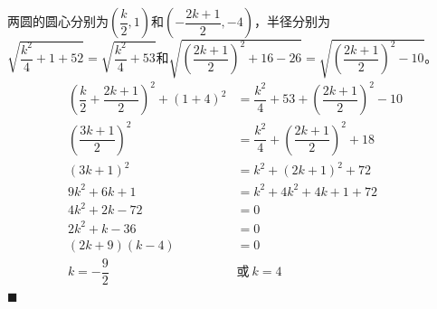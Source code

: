 \documentclass[10pt]{article}
\begin{document}
\begin{enumerate}[leftmargin=*]
        两圆的圆心分别为$\left(\dfrac{k}{2}, 1\right)$和$\left(-\dfrac{2k + 1}{2}, -4\right)$，半径分别为$\sqrt{\dfrac{k^2}{4} + 1 + 52} = \sqrt{\dfrac{k^2}{4} + 53}$和$\sqrt{\left(\dfrac{2k + 1}{2}\right)^2 + 16 - 26} = \sqrt{\left(\dfrac{2k + 1}{2}\right)^2 - 10}$。
        \begin{align*}
          \left(\dfrac{k}{2} + \dfrac{2k + 1}{2}\right)^2 + (1 + 4)^2 & = \dfrac{k^2}{4} + 53 + \left(\dfrac{2k + 1}{2}\right)^2 - 10 \\
          \left(\dfrac{3k + 1}{2}\right)^2                            & = \dfrac{k^2}{4} + \left(\dfrac{2k + 1}{2}\right)^2 + 18      \\
          (3k + 1)^2                                                  & = k^2 + (2k + 1)^2 + 72                                       \\
          9k^2 + 6k + 1                                               & = k^2 + 4k^2 + 4k + 1 + 72                                    \\
          4k^2 + 2k - 72                                              & = 0                                                           \\
          2k^2 + k - 36                                               & = 0                                                           \\
          (2k + 9)(k - 4)                                             & = 0                                                           \\
          k = -\dfrac{9}{2}                                           & \text{或}\ k = 4
        \end{align*} \hfill$\blacksquare$
\end{enumerate}

\newpage
\end{document}
